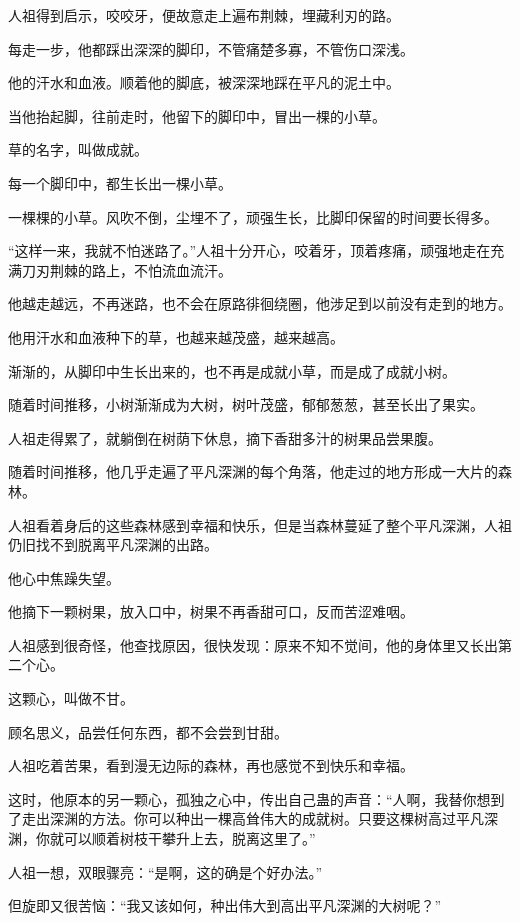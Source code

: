 \begin{this_body}
人祖得到启示，咬咬牙，便故意走上遍布荆棘，埋藏利刃的路。

每走一步，他都踩出深深的脚印，不管痛楚多寡，不管伤口深浅。

他的汗水和血液。顺着他的脚底，被深深地踩在平凡的泥土中。

当他抬起脚，往前走时，他留下的脚印中，冒出一棵的小草。

草的名字，叫做成就。

每一个脚印中，都生长出一棵小草。

一棵棵的小草。风吹不倒，尘埋不了，顽强生长，比脚印保留的时间要长得多。

“这样一来，我就不怕迷路了。”人祖十分开心，咬着牙，顶着疼痛，顽强地走在充满刀刃荆棘的路上，不怕流血流汗。

他越走越远，不再迷路，也不会在原路徘徊绕圈，他涉足到以前没有走到的地方。

他用汗水和血液种下的草，也越来越茂盛，越来越高。

渐渐的，从脚印中生长出来的，也不再是成就小草，而是成了成就小树。

随着时间推移，小树渐渐成为大树，树叶茂盛，郁郁葱葱，甚至长出了果实。

人祖走得累了，就躺倒在树荫下休息，摘下香甜多汁的树果品尝果腹。

随着时间推移，他几乎走遍了平凡深渊的每个角落，他走过的地方形成一大片的森林。

人祖看着身后的这些森林感到幸福和快乐，但是当森林蔓延了整个平凡深渊，人祖仍旧找不到脱离平凡深渊的出路。

他心中焦躁失望。

他摘下一颗树果，放入口中，树果不再香甜可口，反而苦涩难咽。

人祖感到很奇怪，他查找原因，很快发现：原来不知不觉间，他的身体里又长出第二个心。

这颗心，叫做不甘。

顾名思义，品尝任何东西，都不会尝到甘甜。

人祖吃着苦果，看到漫无边际的森林，再也感觉不到快乐和幸福。

这时，他原本的另一颗心，孤独之心中，传出自己蛊的声音：“人啊，我替你想到了走出深渊的方法。你可以种出一棵高耸伟大的成就树。只要这棵树高过平凡深渊，你就可以顺着树枝干攀升上去，脱离这里了。”

人祖一想，双眼骤亮：“是啊，这的确是个好办法。”

但旋即又很苦恼：“我又该如何，种出伟大到高出平凡深渊的大树呢？”


\end{this_body}
